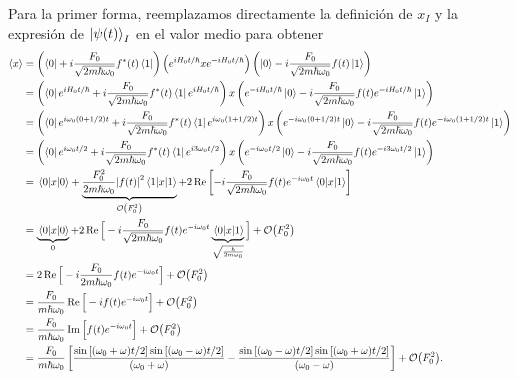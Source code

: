\documentclass[10pt, a4paper]{article}
\numberwithin{equation}{subsection}
\begin{document}
Para la primer forma, reemplazamos directamente la definición de $x_I$ y la
expresión de $\ket{\psi(t)}_I$ en el valor medio para obtener
\begin{align}
  \expval{x}
  &= \left(\bra{0} + i\frac{F_0}{\sqrt{2m\hbar\omega_0}}f^*(t)\bra{1}\right)
    \left(e^{iH_0t/\hbar}xe^{-iH_0t/\hbar}\right)
    \left(\ket{0} - i\frac{F_0}{\sqrt{2m\hbar\omega_0}}f(t)\ket{1}\right)
    \nonumber \\
  &= \left(\bra{0}e^{iH_0t/\hbar} +
    i\frac{F_0}{\sqrt{2m\hbar\omega_0}}f^*(t)\bra{1}e^{iH_0t/\hbar}\right)
    x
    \left(e^{-iH_0t/\hbar}\ket{0} -
    i\frac{F_0}{\sqrt{2m\hbar\omega_0}}f(t)e^{-iH_0t/\hbar}\ket{1}\right)
    \nonumber \\
  &= \left(\bra{0}e^{i\omega_0(0 + 1/2)t} +
    i\frac{F_0}{\sqrt{2m\hbar\omega_0}}f^*(t)\bra{1}e^{i\omega_0(1+1/2)t}\right)
    x
    \left(e^{-i\omega_0(0 + 1/2)t}\ket{0} -
    i\frac{F_0}{\sqrt{2m\hbar\omega_0}}f(t)e^{-i\omega_0(1 + 1/2)t}\ket{1}\right)
    \nonumber \\
  &= \left(\bra{0}e^{i\omega_0t/2} +
    i\frac{F_0}{\sqrt{2m\hbar\omega_0}}f^*(t)\bra{1}e^{i3\omega_0t/2}\right)
    x
    \left(e^{-i\omega_0t/2}\ket{0} -
    i\frac{F_0}{\sqrt{2m\hbar\omega_0}}f(t)e^{-i3\omega_0t/2}\ket{1}\right)
    \nonumber \\
  &= \matrixel{0}{x}{0} + 
    \underbrace{\frac{F_0^2}{2m\hbar\omega_0}\abs{f(t)}^2\matrixel{1}{x}{1}}_{\order{F_0^2}}
    + 2\Re\left[-i\frac{F_0}{\sqrt{2m\hbar\omega_0}}f(t)e^{-i\omega_0t}
    \matrixel{0}{x}{1}\right]
    \nonumber \\
  &= \underbrace{\matrixel{0}{x}{0}}_{0} +
    2\Re\Big[-i\frac{F_0}{\sqrt{2m\hbar\omega_0}}f(t)e^{-i\omega_0t}
    \underbrace{\matrixel{0}{x}{1}}_{\sqrt{\frac{\hbar}{2m\omega_0}}}\Big]
    + \order{F_0^2} \nonumber \\
  &= 2\Re\Big[-i\frac{F_0}{2m\hbar\omega_0}f(t)e^{-i\omega_0t}\Big] +
    \order{F_0^2} \nonumber \\
  &= \frac{F_0}{m\hbar\omega_0}\Re\Big[-if(t)e^{-i\omega_0t}\Big] +
    \order{F_0^2} \nonumber \\
  &= \frac{F_0}{m\hbar\omega_0}\Im\Big[f(t)e^{-i\omega_0t}\Big] +
    \order{F_0^2} \nonumber \\
  &= \frac{F_0}{m\hbar\omega_0} \left[ 
    \frac{\sin\left[(\omega_0+\omega)t/2\right]\sin\left[(\omega_0-\omega)t/2\right]}
    {(\omega_0 + \omega)}  -
    \frac{\sin\left[(\omega_0-\omega)t/2\right]\sin\left[(\omega_0+\omega)t/2\right]}
    {(\omega_0 - \omega)} \right] + \order{F_0^2}.
\end{align}
\end{document}
